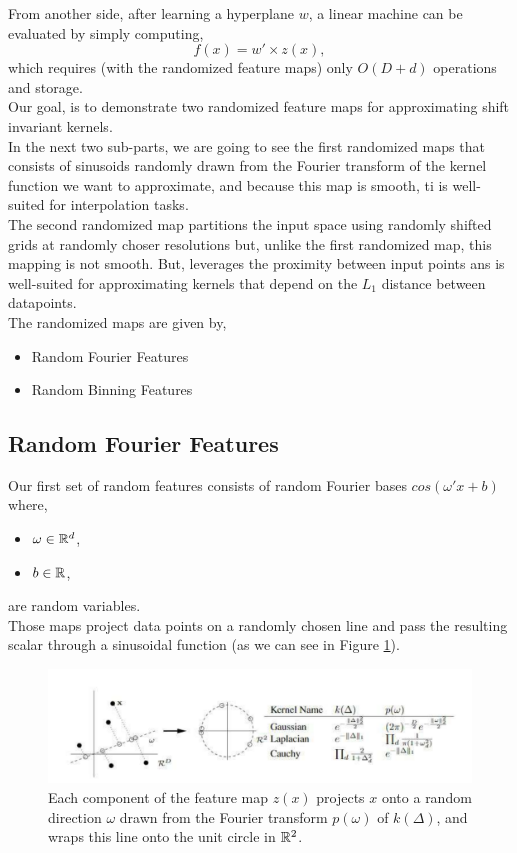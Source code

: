 \documentclass{article}
\begin{document}
From another side, after learning a hyperplane $w$, a linear machine can be evaluated by simply computing, 
\begin{equation*}
    f(x) = w' \times z(x),
\end{equation*}
which requires (with the randomized feature maps) only $O(D+d)$ operations and storage. \\
Our goal, is to demonstrate two randomized feature maps for approximating shift invariant kernels.\\

In the next two sub-parts, we are going to see the first randomized maps that consists of sinusoids randomly drawn from the Fourier transform of the kernel function we want to approximate, and because this map is smooth, ti is well-suited for interpolation tasks. \\
The second randomized map partitions the input space using randomly shifted grids at randomly choser resolutions but, unlike the first randomized map, this mapping is not smooth. But, leverages the proximity between input points ans is well-suited for approximating kernels that depend on the $L_1$ distance between datapoints. \\
The randomized maps are given by, 
\begin{itemize}
    \item Random Fourier Features
    \item Random Binning Features 
\end{itemize}

\subsection{Random Fourier Features}

Our first set of random features consists of random Fourier bases $cos(\omega' x + b)$ where,
\begin{itemize}
    \item $\omega \in \mathbb{R}^d$, 
    \item  $b \in \mathbb{R}$,
\end{itemize}
are random variables. \\
Those maps project data points on a randomly chosen line and pass the resulting scalar through a sinusoidal function (as we can see in Figure \ref{Projection_data_points}). 
\begin{figure}[h!]
    \centering
    \includegraphics[scale=0.7]{images/Random_fourier_features.pdf}
    \caption{Each component of the feature map $z(x)$ projects $x$ onto a random direction $\omega$ drawn from the Fourier transform $p(\omega)$ of $k(\Delta)$, and wraps this line onto the unit circle in $\mathbb{R}^2$.}
    \label{Projection_data_points}
\end{figure}
\end{document}
